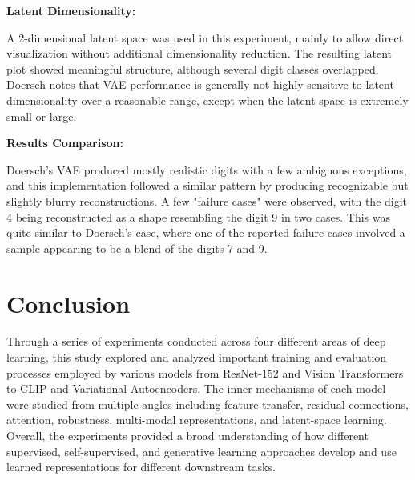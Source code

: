 \documentclass{article}
\begin{document}
\textbf{Latent Dimensionality:}

A 2-dimensional latent space was used in this experiment, mainly to allow direct visualization without additional dimensionality reduction. The resulting latent plot showed meaningful structure, although several digit classes overlapped. Doersch notes that VAE performance is generally not highly sensitive to latent dimensionality over a reasonable range, except when the latent space is extremely small or large.

\textbf{Results Comparison:}

Doersch's VAE produced mostly realistic digits with a few ambiguous exceptions, and this implementation followed a similar pattern by producing recognizable but slightly blurry reconstructions. A few "failure cases" were observed, with the digit 4 being reconstructed as a shape resembling the digit 9 in two cases. This was quite similar to Doersch's case, where one of the reported failure cases involved a sample appearing to be a blend of the digits 7 and 9.


\section{Conclusion}
Through a series of experiments conducted across four different areas of deep learning, this study explored and analyzed important training and evaluation processes employed by various models from ResNet-152 and Vision Transformers to CLIP and Variational Autoencoders. The inner mechanisms of each model were studied from multiple angles including feature transfer, residual connections, attention, robustness, multi-modal representations, and latent-space learning. Overall, the experiments provided a broad understanding of how different supervised, self-supervised, and generative learning approaches develop and use learned representations for different downstream tasks.



\end{document}
